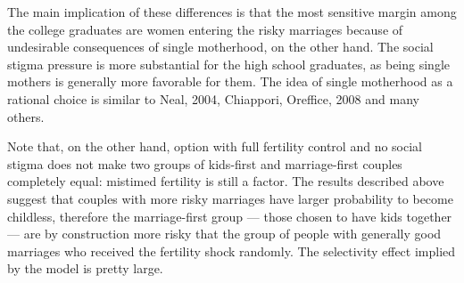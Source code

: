 \documentclass[12pt,letter]{article}
\begin{document}
The main implication of these differences is that the most sensitive margin among the college graduates are women entering the risky marriages because of undesirable consequences of single motherhood, on the other hand. The social stigma pressure is more substantial for the high school graduates, as being single mothers is generally more favorable for them. The idea of single motherhood as a rational choice is similar to Neal, 2004, Chiappori, Oreffice, 2008 and many others.

Note that, on the other hand, option with full fertility control and no social stigma does not make two groups of kids-first and marriage-first couples completely equal: mistimed fertility is still a factor. The results described above suggest that couples with more risky marriages have larger probability to become childless, therefore the marriage-first group --- those chosen to have kids together --- are by construction more risky that the group of people with generally good marriages who received the fertility shock randomly. The selectivity effect implied by the model is pretty large.
\end{document}
